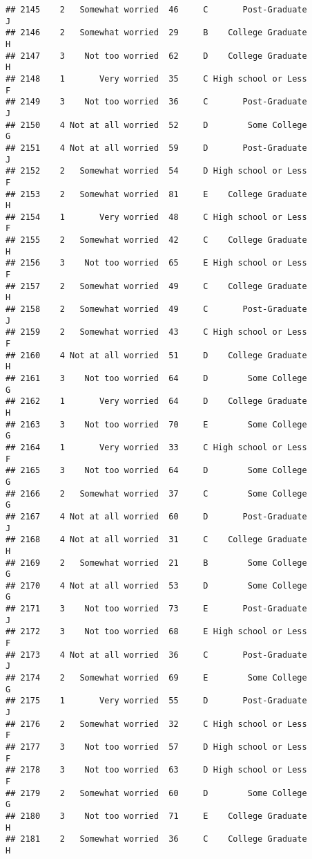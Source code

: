 \documentclass[
]{article}
\begin{document}
\begin{verbatim}
## 2145    2   Somewhat worried  46     C       Post-Graduate         J
## 2146    2   Somewhat worried  29     B    College Graduate         H
## 2147    3    Not too worried  62     D    College Graduate         H
## 2148    1       Very worried  35     C High school or Less         F
## 2149    3    Not too worried  36     C       Post-Graduate         J
## 2150    4 Not at all worried  52     D        Some College         G
## 2151    4 Not at all worried  59     D       Post-Graduate         J
## 2152    2   Somewhat worried  54     D High school or Less         F
## 2153    2   Somewhat worried  81     E    College Graduate         H
## 2154    1       Very worried  48     C High school or Less         F
## 2155    2   Somewhat worried  42     C    College Graduate         H
## 2156    3    Not too worried  65     E High school or Less         F
## 2157    2   Somewhat worried  49     C    College Graduate         H
## 2158    2   Somewhat worried  49     C       Post-Graduate         J
## 2159    2   Somewhat worried  43     C High school or Less         F
## 2160    4 Not at all worried  51     D    College Graduate         H
## 2161    3    Not too worried  64     D        Some College         G
## 2162    1       Very worried  64     D    College Graduate         H
## 2163    3    Not too worried  70     E        Some College         G
## 2164    1       Very worried  33     C High school or Less         F
## 2165    3    Not too worried  64     D        Some College         G
## 2166    2   Somewhat worried  37     C        Some College         G
## 2167    4 Not at all worried  60     D       Post-Graduate         J
## 2168    4 Not at all worried  31     C    College Graduate         H
## 2169    2   Somewhat worried  21     B        Some College         G
## 2170    4 Not at all worried  53     D        Some College         G
## 2171    3    Not too worried  73     E       Post-Graduate         J
## 2172    3    Not too worried  68     E High school or Less         F
## 2173    4 Not at all worried  36     C       Post-Graduate         J
## 2174    2   Somewhat worried  69     E        Some College         G
## 2175    1       Very worried  55     D       Post-Graduate         J
## 2176    2   Somewhat worried  32     C High school or Less         F
## 2177    3    Not too worried  57     D High school or Less         F
## 2178    3    Not too worried  63     D High school or Less         F
## 2179    2   Somewhat worried  60     D        Some College         G
## 2180    3    Not too worried  71     E    College Graduate         H
## 2181    2   Somewhat worried  36     C    College Graduate         H

\end{verbatim}
\end{document}
